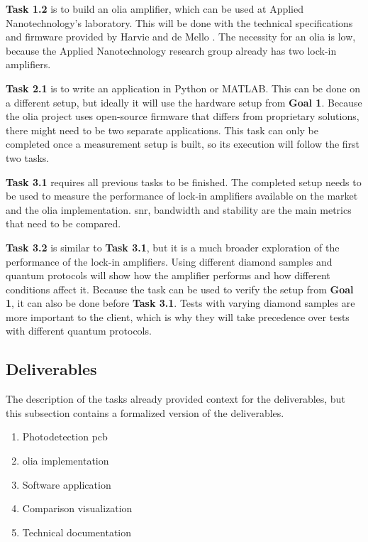 \textbf{Task 1.2} is to build an \gls{olia} amplifier, which can be used at Applied Nanotechnology's laboratory. This will be done with the technical specifications and firmware provided by Harvie and de Mello \cite{harvie2023olia}. The necessity for an \gls{olia} is low, because the Applied Nanotechnology research group already has two lock-in amplifiers.

\textbf{Task 2.1} is to write an application in Python or MATLAB. This can be done on a different setup, but ideally it will use the hardware setup from \textbf{Goal 1}. Because the \gls{olia} project uses open-source firmware that differs from proprietary solutions, there might need to be two separate applications. This task can only be completed once a measurement setup is built, so its execution will follow the first two tasks.

\textbf{Task 3.1} requires all previous tasks to be finished. The completed setup needs to be used to measure the performance of lock-in amplifiers available on the market and the \gls{olia} implementation. \gls{snr}, bandwidth and stability are the main metrics that need to be compared.

\textbf{Task 3.2} is similar to \textbf{Task 3.1}, but it is a much broader exploration of the performance of the lock-in amplifiers. Using different diamond samples and quantum protocols will show how the amplifier performs and how different conditions affect it. Because the task can be used to verify the setup from \textbf{Goal 1}, it can also be done before \textbf{Task 3.1}. Tests with varying diamond samples are more important to the client, which is why they will take precedence over tests with different quantum protocols.


\subsection{Deliverables}
The description of the tasks already provided context for the deliverables, but this subsection contains a formalized version of the deliverables.

\begin{enumerate}
	\item Photodetection \gls{pcb} 
	\item \gls{olia} implementation
	\item Software application
	\item Comparison visualization
	\item Technical documentation
\end{enumerate}

